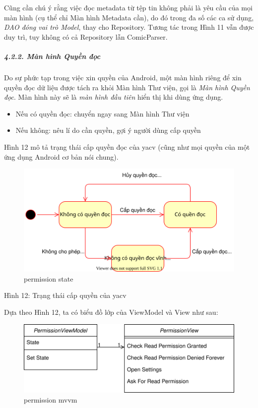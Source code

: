 \documentclass[
]{article}
\providecommand{\tightlist}{%
  \setlength{\itemsep}{0pt}\setlength{\parskip}{0pt}}
\begin{document}
Cũng cần chú ý rằng việc đọc metadata từ tệp tin không phải là yêu cầu
của mọi màn hình (cụ thể chỉ Màn hình Metadata cần), do đó trong đa số
các ca sử dụng, \emph{DAO đóng vai trò Model}, thay cho Repository.
Tương tác trong Hình 11 vẫn được duy trì, tuy không có cả Repository lẫn
ComicParser.

\hypertarget{muxe0n-huxecnh-quyux1ec1n-ux111ux1ecdc}{%
\subparagraph{\texorpdfstring{4.2.2. Màn hình Quyền đọc
}{4.2.2. Màn hình Quyền đọc }}\label{muxe0n-huxecnh-quyux1ec1n-ux111ux1ecdc}}

Do sự phức tạp trong việc xin quyền của Android, một màn hình riêng để
xin quyền đọc dữ liệu được tách ra khỏi Màn hình Thư viện, gọi là
\emph{Màn hình Quyền đọc}. Màn hình này sẽ là \emph{màn hình đầu tiên}
hiển thị khi dùng ứng dụng.

\begin{itemize}
\tightlist
\item
  Nếu có quyền đọc: chuyển ngay sang Màn hình Thư viện
\item
  Nếu không: nêu lí do cần quyền, gợi ý người dùng cấp quyền
\end{itemize}

Hình 12 mô tả trạng thái cấp quyền đọc của yacv (cũng như mọi quyền của
một ứng dụng Android cơ bản nói chung).

\begin{figure}
\centering
\includegraphics{../images/read_permission_state.svg}
\caption{permission state}
\end{figure}

Hình 12: Trạng thái cấp quyền của yacv

Dựa theo Hình 12, ta có biểu đồ lớp của ViewModel và View như sau:

\begin{figure}
\centering
\includegraphics{../images/read_permission_mvvm_class.svg}
\caption{permission mvvm}
\end{figure}
\end{document}
